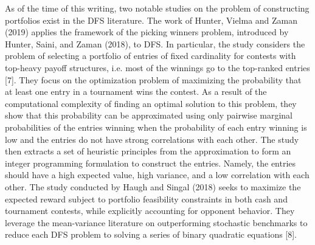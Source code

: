 \documentclass{article}
\begin{document}
As of the time of this writing, two notable studies on the problem of constructing portfolios exist in the DFS literature. The work of Hunter, Vielma and Zaman (2019) applies the framework of the picking winners problem, introduced by Hunter, Saini, and Zaman (2018), to DFS. In particular, the study considers the problem of selecting a portfolio of entries of fixed cardinality for contests with top-heavy payoff structures, i.e. most of the winnings go to the top-ranked entries [7]. They focus on the optimization problem of maximizing the probability that at least one entry in a tournament wins the contest. As a result of the computational complexity of finding an optimal solution to this problem, they show that this probability can be approximated using only pairwise marginal probabilities of the entries winning when the probability of each entry winning is low and the entries do not have strong correlations with each other. The study then extracts a set of heuristic principles from the approximation to form an integer programming formulation to construct the entries. Namely, the entries should have a high expected value, high variance, and a low correlation with each other. The study conducted by Haugh and Singal (2018) seeks to maximize the expected reward subject to portfolio feasibility constraints in both cash and tournament contests, while explicitly accounting for opponent behavior. They leverage the mean-variance literature on outperforming stochastic benchmarks to reduce each DFS problem to solving a series of binary quadratic equations [8].\\
\\
\end{document}
